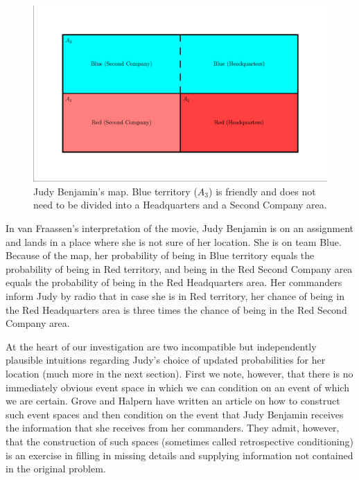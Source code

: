 \documentclass[12pt]{article}
\begin{document}
\begin{figure}[h]
  \begin{flushright}
    \begin{minipage}[h]{.8\linewidth}
      \includegraphics[width=\textwidth]{judy.eps}
      \caption{Judy Benjamin's map. Blue territory ($A_{3}$) is friendly and
        does not need to be divided into a Headquarters and a Second
        Company area.}
      \label{fig:map}
    \end{minipage}
  \end{flushright}
\end{figure}

In van Fraassen's interpretation of the movie, Judy Benjamin is on an
assignment and lands in a place where she is not sure of her location.
She is on team Blue. Because of the map, her probability of being in
Blue territory equals the probability of being in Red territory, and
being in the Red Second Company area equals the probability of being
in the Red Headquarters area. Her commanders inform Judy by radio that
in case she is in Red territory, her chance of being in the Red
Headquarters area is three times the chance of being in the Red Second
Company area.

At the heart of our investigation are two incompatible but independently
plausible intuitions regarding Judy's choice of updated probabilities for her
location (much more in the next section). First we note, however, that there
is no immediately obvious event space in which we can condition on an event
of which we are certain. Grove and Halpern have written an article
 on how to construct such event spaces and then
condition on the event that Judy Benjamin receives the information that she
receives from her commanders. They admit, however, that the construction of
such spaces (sometimes called retrospective conditioning) is an exercise in
filling in missing details and supplying information not contained in the
original problem.
\end{document}
